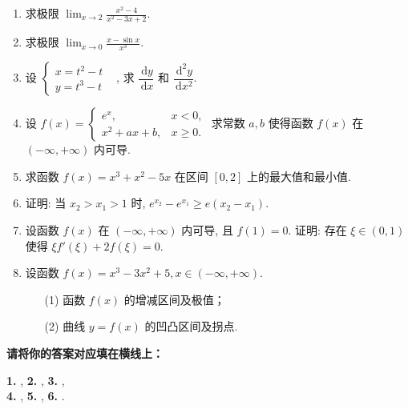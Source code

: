 \documentclass[simple]{hfutexam}
\newcommand{\diff}{\,\mathrm{d}}
\begin{document}
\begin{enumerate}
\item 求极限 $\displaystyle\lim_{x\to2}\frac{x^2-4}{x^2-3x+2}$.
\item 求极限 $\displaystyle\lim_{x\to0}\frac{x-\sin x}{x^3}$.
\item 设 $\begin{cases}x=t^2-t&\\y=t^3-t&\end{cases}$, 求 $\dfrac{\diff y}{\diff x}$ 和 $\dfrac{\diff^2 y}{\diff x^2}$.
\item 设 $f(x)=\begin{cases}e^x,&x<0,\\x^2+ax+b,&x\ge0.\end{cases}$
求常数 $a,b$ 使得函数 $f(x)$ 在 $(-\infty,+\infty)$ 内可导.
\item	求函数 $f(x)=x^3+x^2-5x$ 在区间 $[0,2]$ 上的最大值和最小值.
\item 证明: 当 $x_2>x_1>1$ 时, $e^{x_2}-e^{x_1}\ge e(x_2-x_1)$.
\item 设函数 $f(x)$ 在 $(-\infty,+\infty)$ 内可导, 且 $f(1)=0$.
证明: 存在 $\xi\in(0,1)$ 使得 $\xi f'(\xi)+2f(\xi)=0$.
\item 设函数 $f(x)=x^3-3x^2+5, x\in(-\infty,+\infty)$. 
\begin{enumerate}
\item[(1)] 函数 $f(x)$ 的增减区间及极值；
\item[(2)] 曲线 $y=f(x)$ 的凹凸区间及拐点.
\end{enumerate}
\end{enumerate}

\newpage
{}
\maketitle


\textbf{请将你的答案对应填在横线上：}

\textbf{1.} ,
\textbf{2.} \fillblankframe{$-2\sin(2x+1)\diff x$},
\textbf{3.} ,\\
\textbf{4.} ,
\textbf{5.} ,
\textbf{6.} .
\end{document}
